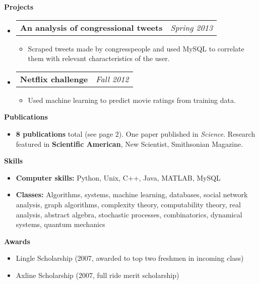 \documentclass[letterpaper,11pt]{article}
\makeatletter
\newcommand{\resitem}[1]{\item #1 \vspace{-2pt}}
\newcommand{\resheading}[1]{{\large \colorbox{mygrey}{\begin{minipage}{\textwidth}{\textbf{#1 \vphantom{p\^{E}}}}\end{minipage}}}}
\newcommand{\ressubheading}[4]{
\begin{tabular*}{7.0in}{l@{\extracolsep{\fill}}r}
		\textbf{#1} & \textit{#4} \\
\end{tabular*}\vspace{-6pt}}
\makeatother
\begin{document}
\begin{itemize}

\end{itemize}

\resheading{Projects}
\begin{itemize}
\item
	\ressubheading{An analysis of congressional tweets}{Pasadena, CA}{Student}{Spring 2013}
	\begin{itemize}
		\resitem{Scraped tweets made by congresspeople and used MySQL to correlate them with relevant characteristics of the user.}
	\end{itemize}
\item
	\ressubheading{Netflix challenge}{Pasadena, CA}{Student}{Fall 2012}
	\begin{itemize}
		\resitem{Used machine learning to predict movie ratings from training data.}
	\end{itemize}
\end{itemize}

\resheading{Publications}
\begin{itemize}
	\item {\bf 8 publications} total (see page 2).  One paper published in \emph{Science}.  Research featured in {\bf Scientific American}, New Scientist, Smithsonian Magazine.
\end{itemize}

\resheading{Skills}
\begin{itemize}
\item \textbf{Computer skills:} Python, Unix, C++, Java, MATLAB, MySQL
\item \textbf{Classes:} Algorithms, systems, machine learning, databases, social network analysis, graph algorithms, complexity theory, computability theory, real analysis, abstract algebra, stochastic processes, combinatorics, dynamical systems, quantum mechanics
\end{itemize}

\resheading{Awards}
\begin{itemize}
	\item Lingle Scholarship (2007, awarded to top two freshmen in incoming class)
	\item Axline Scholarship (2007, full ride merit scholarship)
\end{itemize}
\end{document}
